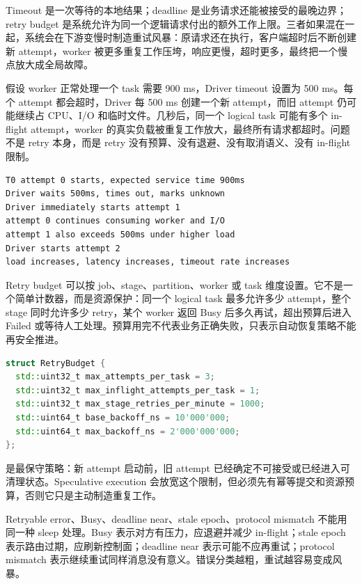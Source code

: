 Timeout 是一次等待的本地结果；deadline 是业务请求还能被接受的最晚边界；retry budget 是系统允许为同一个逻辑请求付出的额外工作上限。三者如果混在一起，系统会在下游变慢时制造重试风暴：原请求还在执行，客户端超时后不断创建新 attempt，worker 被更多重复工作压垮，响应更慢，超时更多，最终把一个慢点放大成全局故障。

假设 worker 正常处理一个 task 需要 900 ms，Driver timeout 设置为 500 ms。每个 attempt 都会超时，Driver 每 500 ms 创建一个新 attempt，而旧 attempt 仍可能继续占 CPU、I/O 和临时文件。几秒后，同一个 logical task 可能有多个 in-flight attempt，worker 的真实负载被重复工作放大，最终所有请求都超时。问题不是 retry 本身，而是 retry 没有预算、没有退避、没有取消语义、没有 in-flight 限制。

\begin{lstlisting}[numbers=none,caption={无预算重试风暴的事件链}]
T0 attempt 0 starts, expected service time 900ms
Driver waits 500ms, times out, marks unknown
Driver immediately starts attempt 1
attempt 0 continues consuming worker and I/O
attempt 1 also exceeds 500ms under higher load
Driver starts attempt 2
load increases, latency increases, timeout rate increases
\end{lstlisting}

Retry budget 可以按 job、stage、partition、worker 或 task 维度设置。它不是一个简单计数器，而是资源保护：同一个 logical task 最多允许多少 attempt，整个 stage 同时允许多少 retry，某个 worker 返回 Busy 后多久再试，超出预算后进入 Failed 或等待人工处理。预算用完不代表业务正确失败，只表示自动恢复策略不能再安全推进。

\begin{lstlisting}[language=C++,caption={RetryBudget 的示例形态}]
struct RetryBudget {
  std::uint32_t max_attempts_per_task = 3;
  std::uint32_t max_inflight_attempts_per_task = 1;
  std::uint32_t max_stage_retries_per_minute = 1000;
  std::uint64_t base_backoff_ns = 10'000'000;
  std::uint64_t max_backoff_ns = 2'000'000'000;
};
\end{lstlisting}

 是最保守策略：新 attempt 启动前，旧 attempt 已经确定不可接受或已经进入可清理状态。Speculative execution 会放宽这个限制，但必须先有幂等提交和资源预算，否则它只是主动制造重复工作。

Retryable error、Busy、deadline near、stale epoch、protocol mismatch 不能用同一种 sleep 处理。Busy 表示对方有压力，应退避并减少 in-flight；stale epoch 表示路由过期，应刷新控制面；deadline near 表示可能不应再重试；protocol mismatch 表示继续重试同样消息没有意义。错误分类越粗，重试越容易变成风暴。

